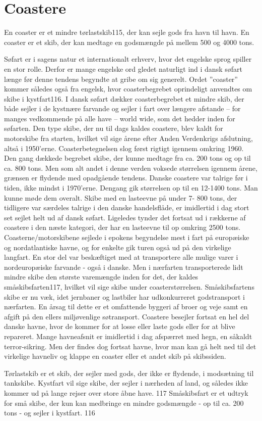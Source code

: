\part{Coastere}\label{coastere}

En coaster er et mindre tørlastskib115, der kan sejle gods fra havn til
havn. En coaster er et skib, der kan medtage en godsmængde på mellem 500
og 4000 tons.

Søfart er i sagens natur et internationalt erhverv, hvor
det engelske sprog spiller en stor rolle. Derfor er mange engelske ord
gledet naturligt ind i dansk søfart længe før denne tendens begyndte at
gribe om sig generelt. Ordet ''coaster'' kommer således også fra
engelsk, hvor coasterbegrebet oprindeligt anvendtes om skibe i
kystfart116. I dansk søfart dækker coasterbegrebet et mindre skib, der
både sejler i de kystnære farvande og sejler i fart over længere
afstande -- for manges vedkommende på alle have -- world wide, som det
hedder inden for søfarten. Den type skibe, der nu til dags kaldes
coastere, blev kaldt for motorskibe fra starten, hvilket vil sige årene
efter Anden Verdenkrigs afslutning, altså i 1950'erne.
Coasterbetegnelsen slog først rigtigt igennem omkring 1960. Den gang
dækkede begrebet skibe, der kunne medtage fra ca. 200 tons og op til ca.
800 tons. Men som alt andet i denne verden voksede størrelsen igennem
årene, grænsen er flydende med opadgående tendens. Danske coastere var
talrige før i tiden, ikke mindst i 1970'erne. Dengang gik størrelsen op
til en 12-1400 tons. Man kunne møde dem overalt. Skibe med en lasteevne
på under 7- 800 tons, der tidligere var særdeles talrige i den danske
handelsflåde, er imidlertid i dag stort set sejlet helt ud af dansk
søfart. Ligeledes tynder det fortsat ud i rækkerne af coastere i den
næste kategori, der har en lasteevne til op omkring 2500 tons.
Coasterne/motorskibene sejlede i epokens begyndelse mest i fart på
europæiske og nordatlantiske havne, og for enkelte gik turen også ud på
den virkelige langfart. En stor del var beskæftiget med at transportere
alle mulige varer i nordeuropæiske farvande - også i danske. Men i
nærfarten transporterede lidt mindre skibe den største varemængde inden
for det, der kaldes småskibsfarten117, hvilket vil sige skibe under
coasterstørrelsen. Småskibsfartens skibe er nu væk, idet jernbaner og
lastbiler har udkonkurreret godstransport i nærfarten. En årsag til
dette er et omfattende byggeri af broer og veje samt en afgift på den
ellers miljøvenlige søtransport. Coastere besejler fortsat en hel del
danske havne, hvor de kommer for at losse eller laste gods eller for at
blive repareret. Mange havneafsnit er imidlertid i dag afspærret med
hegn, en såkaldt terror-sikring. Men der findes dog fortsat havne, hvor
man kan gå helt ned til det virkelige havneliv og klappe en coaster
eller et andet skib på skibssiden.

Tørlastskib er et skib, der sejler med gods, der ikke er flydende, i
modsætning til tankskibe. Kystfart vil sige skibe, der sejler i nærheden
af land, og således ikke kommer ud på lange rejser over store åbne have.
117 Småskibsfart er et udtryk for små skibe, der kun kan medbringe en
mindre godsmængde - op til ca. 200 tons - og sejler i kystfart. 116
